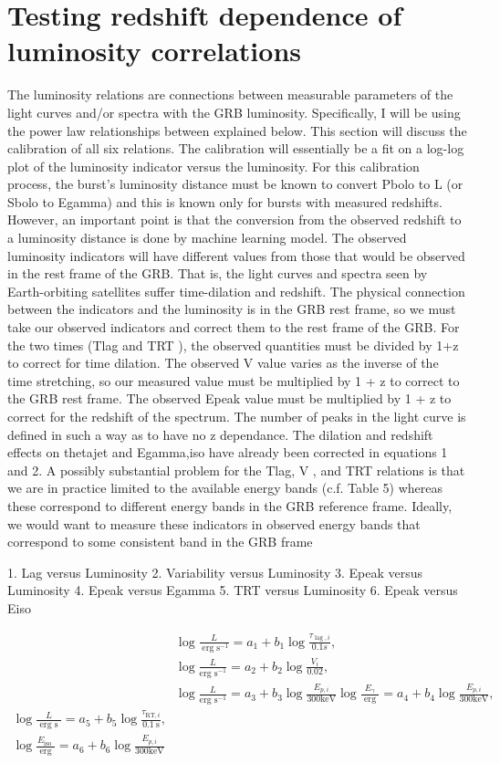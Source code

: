\section{Testing redshift dependence of luminosity correlations}
The luminosity relations are connections between measurable parameters of the light curves and/or spectra with the GRB luminosity. Specifically, I will be using the power law relationships between explained below. This section will discuss the calibration of all six relations. The calibration will essentially be a fit on a log-log plot of the luminosity indicator versus the luminosity. For this calibration process, the burst’s luminosity distance must be known to convert Pbolo to L (or Sbolo to Egamma) and this is known only for bursts with measured redshifts. However, an important point is that the conversion from the observed redshift to a luminosity distance is done by machine learning model. The observed luminosity indicators will have different values from those that would be observed in the rest frame of the GRB. That is, the light curves and spectra seen by Earth-orbiting satellites suffer time-dilation and redshift. The physical connection between the indicators and the luminosity is in the GRB rest frame, so we must take our observed indicators and correct them to the rest frame of the GRB. For the two times (Tlag and TRT ), the observed quantities must be divided by 1+z to correct for time dilation. The observed V value varies as the inverse of the time stretching, so our measured value must be multiplied by 1 + z to correct to the GRB rest frame. The observed Epeak value must be multiplied by 1 + z to correct for the redshift of the spectrum. The number of peaks in the light curve is defined in such a way as to have no z dependance. The dilation and redshift effects on thetajet and Egamma,iso have already been corrected in equations 1 and 2. A possibly substantial problem for the Tlag, V , and TRT relations is that we are in practice limited to the available energy bands (c.f. Table 5) whereas these correspond to different energy bands in the GRB reference frame. Ideally, we would want to measure these indicators in observed energy bands that correspond to some consistent band in the GRB frame

1. Lag versus Luminosity
2. Variability versus Luminosity
3. Epeak versus Luminosity
4. Epeak versus Egamma
5. TRT versus Luminosity
6. Epeak versus Eiso

\begin{align}
& \log \frac{L}{\operatorname{erg} \mathrm{s}^{-1}}=a_{1}+b_{1} \log \frac{\tau_{\operatorname{lag}, i}}{0.1 s}, \\
& \log \frac{L}{\operatorname{erg~s}^{-1}}=a_{2}+b_{2} \log \frac{V_{i}}{0.02}, \\
& \log \frac{L}{\operatorname{erg~s}^{-1}}=a_{3}+b_{3} \log \frac{E_{p, i}}{300 \mathrm{keV}} 
\log \frac{E_{\gamma}}{\text { erg }}=a_{4}+b_{4} \log \frac{E_{p, i}}{300 \mathrm{keV}}, \\
\log \frac{L}{\text { erg s }}=a_{5}+b_{5} \log \frac{\tau_{\mathrm{RT}, i}}{0.1 \mathrm{~s}}, \\
\log \frac{E_{\text {iso }}}{\text { erg }}=a_{6}+b_{6} \log \frac{E_{p, i}}{300 \mathrm{keV}}
\end{align}

